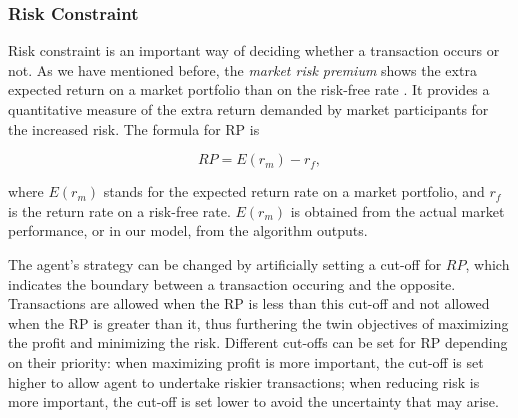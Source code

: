 \documentclass{mcmthesis}
\begin{document}
\subsubsection{Risk Constraint \label{risk-constraint}}


Risk constraint is an important way of deciding whether a transaction occurs or not.
As we have mentioned before, the \textit{market risk premium} shows the extra expected return on a market portfolio than on the risk-free rate \cite{duarte2015equity}.
It provides a quantitative measure of the extra return demanded by market participants for the increased risk.
The formula for RP is

\begin{equation}
  RP = E(r_m) - r_f,
\end{equation}

where $E(r_m)$ stands for the expected return rate on a market portfolio, and $r_f$ is the return rate on a risk-free rate.
$E(r_m)$ is obtained from the actual market performance, or in our model,
from the algorithm outputs.


The agent's strategy can be changed by artificially setting a cut-off for $RP$,
which indicates the boundary between a transaction occuring and the opposite.
Transactions are allowed when the RP is less than this cut-off and not allowed when the RP is greater than it, thus furthering the twin objectives of maximizing the profit and minimizing the risk.
Different cut-offs can be set for RP depending on their priority: when maximizing profit is more important, the cut-off is set higher to allow agent to undertake riskier transactions; when reducing risk is more important, the cut-off is set lower to avoid the uncertainty that may arise.

\end{document}
